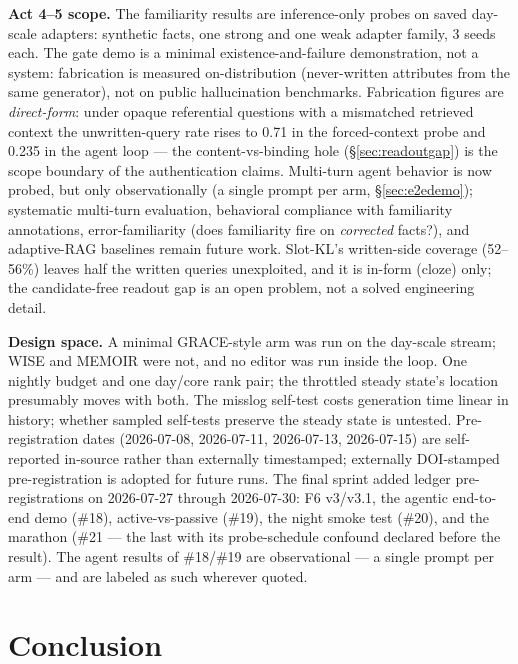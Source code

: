 \documentclass[11pt]{article}
\begin{document}
\textbf{Act 4--5 scope.} The familiarity results are inference-only probes on saved day-scale
adapters: synthetic facts, one strong and one weak adapter family, 3 seeds each.
The gate demo is a minimal existence-and-failure demonstration, not a system: fabrication is
measured on-distribution (never-written attributes from the same generator), not on public
hallucination benchmarks. Fabrication figures are \emph{direct-form}: under opaque referential
questions with a mismatched retrieved context the unwritten-query rate rises to 0.71 in the
forced-context probe and 0.235 in the agent loop --- the content-vs-binding hole
(\S\ref{sec:readoutgap}) is the scope boundary of the authentication claims. Multi-turn agent
behavior is now probed, but only observationally (a single prompt per arm,
\S\ref{sec:e2edemo}); systematic multi-turn evaluation, behavioral compliance with familiarity
annotations,
error-familiarity (does familiarity fire on \emph{corrected} facts?), and adaptive-RAG baselines
\citep{flare2023,seakr2024,skr2023} remain future work. Slot-KL's written-side coverage (52--56\%)
leaves half the written queries unexploited, and it is in-form (cloze) only; the candidate-free
readout gap is an open problem,
not a solved engineering detail.

\textbf{Design space.} A minimal GRACE-style arm was run on the day-scale stream; WISE and
MEMOIR were not, and no editor was run inside the loop. One nightly budget and one day/core rank
pair; the throttled steady state's location presumably moves with both. The misslog self-test
costs generation time linear in history; whether sampled self-tests preserve the steady state is
untested. Pre-registration dates (2026-07-08, 2026-07-11, 2026-07-13, 2026-07-15) are
self-reported in-source rather than externally timestamped; externally DOI-stamped
pre-registration is adopted for future runs. The final sprint added ledger pre-registrations on
2026-07-27 through 2026-07-30: F6 v3/v3.1, the agentic end-to-end demo (\#18), active-vs-passive
(\#19), the night smoke test (\#20), and the marathon (\#21 --- the last with its probe-schedule
confound declared before the result). The agent results of \#18/\#19 are observational --- a
single prompt per arm --- and are labeled as such wherever quoted.

\section{Conclusion}
\end{document}
